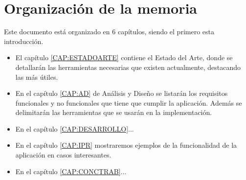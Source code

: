   \section{Organización de la memoria\label{SEC:ORGANIZACION}}
    Este documento está organizado en 6 capítulos, siendo el primero esta introducción. 
        \begin{itemize}
      \item El capítulo \ref{CAP:ESTADOARTE} contiene el Estado del Arte, donde se detallarán las herramientas necesarias que existen actualmente, destacando las más útiles.
      \item En el capítulo \ref{CAP:AD} de Análisis y Diseño se listarán los requisitos funcionales y no funcionales que tiene que cumplir la aplicación. Además se delimitarán las herramientas que se usarán en la implementación.
      \item En el capítulo \ref{CAP:DESARROLLO}...
      \item En el capítulo \ref{CAP:IPR} mostraremos ejemplos de la funcionalidad de la aplicación en casos interesantes.
      \item En el capítulo \ref{CAP:CONCTRAB}...
    \end{itemize}
    
    
